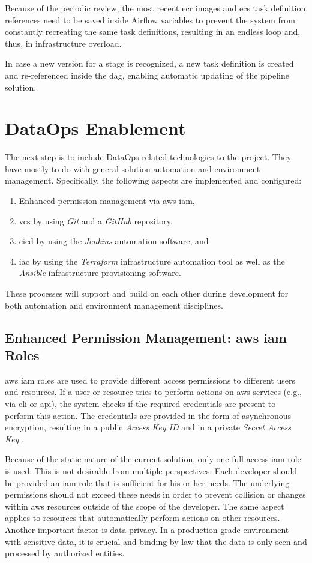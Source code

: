 Because of the periodic review, the most recent \ac{ecr} images and \ac{ecs} task definition references need to be saved inside Airflow variables to prevent the system from constantly recreating the same task definitions, resulting in an endless loop and, thus, in infrastructure overload.

In case a new version for a stage is recognized, a new task definition is created and re-referenced inside the \ac{dag}, enabling automatic updating of the pipeline solution.

\section{DataOps Enablement}
The next step is to include DataOps-related technologies to the project. They have mostly to do with general solution automation and environment management. Specifically, the following aspects are implemented and configured:

\begin{enumerate}
	\item Enhanced permission management via \acs{aws} \acf{iam},
	\item \acf{vcs} by using \textit{Git} and a \textit{GitHub} repository,
	\item \acf{cicd} by using the \textit{Jenkins} automation software, and
	\item \acf{iac} by using the \textit{Terraform} infrastructure automation tool as well as the \textit{Ansible} infrastructure provisioning software.
\end{enumerate}

These processes will support and build on each other during development for both automation and environment management disciplines.

\subsection{Enhanced Permission Management: \acs{aws} \acs{iam} Roles}
\acs{aws} \acs{iam} roles are used to provide different access permissions to different users and resources. If a user or resource tries to perform actions on \ac{aws} services (e.g., via \acs{cli} or \acs{api}), the system checks if the required credentials are present to perform this action. The credentials are provided in the form of asynchronous encryption, resulting in a public \textit{Access Key ID} and in a private \textit{Secret Access Key} \cite{iam}.

Because of the static nature of the current solution, only one full-access \ac{iam} role is used. This is not desirable from multiple perspectives. Each developer should be provided an \ac{iam} role that is sufficient for his or her needs. The underlying permissions should not exceed these needs in order to prevent collision or changes within \ac{aws} resources outside of the scope of the developer. The same aspect applies to resources that automatically perform actions on other resources. Another important factor is data privacy. In a production-grade environment with sensitive data, it is crucial and binding by law that the data is only seen and processed by authorized entities. 


